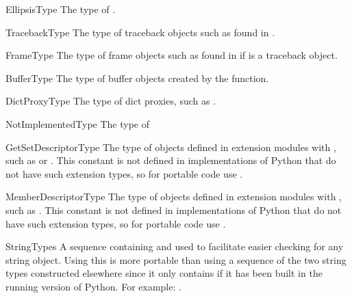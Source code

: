 \begin{datadesc}{EllipsisType}
The type of .
\end{datadesc}

\begin{datadesc}{TracebackType}
The type of traceback objects such as found in
.
\end{datadesc}

\begin{datadesc}{FrameType}
The type of frame objects such as found in  if
 is a traceback object.
\end{datadesc}

\begin{datadesc}{BufferType}
The type of buffer objects created by the
 function.
\end{datadesc}

\begin{datadesc}{DictProxyType}
The type of dict proxies, such as .
\end{datadesc}

\begin{datadesc}{NotImplementedType}
The type of 
\end{datadesc}

\begin{datadesc}{GetSetDescriptorType}
The type of objects defined in extension modules with , such
as  or .  This constant is
not defined in implementations of Python that do not have such extension
types, so for portable code use .
\end{datadesc}

\begin{datadesc}{MemberDescriptorType}
The type of objects defined in extension modules with , such
as .  This constant is not defined in
implementations of Python that do not have such extension types, so for
portable code use .
\end{datadesc}

\begin{datadesc}{StringTypes}
A sequence containing  and  used to
facilitate easier checking for any string object.  Using this is more
portable than using a sequence of the two string types constructed
elsewhere since it only contains  if it has been
built in the running version of Python.  For example:
.
\end{datadesc}
